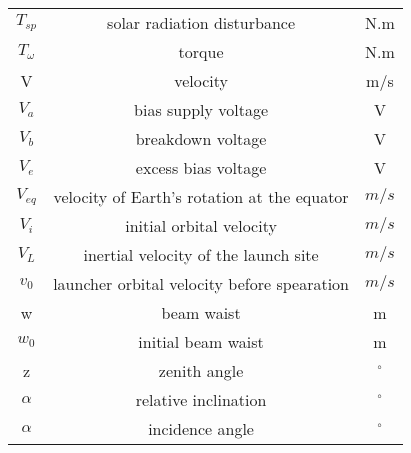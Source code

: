\begin{center}
\begin{longtable}{c|c|c}
$T_{sp}$                        		& solar radiation disturbance                 														& N.m \\

$T_{\omega}$                       	& torque                                 																	& N.m \\

V																		& velocity																																& m/s \\

$V_a$ 															& bias supply voltage 																										& V \\

$V_b$ 															& breakdown voltage																												& V \\

$V_e$ 															& excess bias voltage																											& V \\

$V_{eq}$                            & velocity of Earth's rotation at the equator 														& $m/s$ \\

$V_i$                               & initial orbital velocity      																					& $m/s$ \\

$V_L$                               & inertial velocity of the launch site        														& $m/s$ \\

$v_0$                               & launcher orbital velocity before spearation 														& $m/s$ \\

w																		& beam waist																															& m \\

$w_0$                       				& initial beam waist                                      								& m \\

z                             			& zenith angle                                  													& $^\circ$ \\     
 
$\alpha$                            & relative inclination                        														& $^\circ$ \\

$\alpha$                            & incidence angle                        																	& $^\circ$ \\


\end{longtable}
\end{center}
